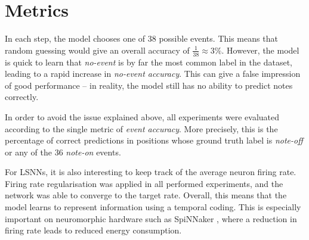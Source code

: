 \documentclass[../../report.tex]{subfiles}
\begin{document}
\section{Metrics}

In each step, the model chooses one of 38 possible events. This means that
random guessing would give an overall accuracy of \(\frac{1}{38} \approx 3\%\).
However, the model is quick to learn that \emph{no-event} is by far the most
common label in the dataset, leading to a rapid increase in \emph{no-event
accuracy}. This can give a false impression of good performance -- in reality,
the model still has no ability to predict notes correctly.


In order to avoid the issue explained above, all experiments were evaluated
according to the single metric of \emph{event accuracy}. More precisely, this is
the percentage of correct predictions in positions whose ground truth label is
\emph{note-off} or any of the 36 \emph{note-on} events.

For LSNNs, it is also interesting to keep track of the average neuron firing
rate. Firing rate regularisation was applied in all performed
experiments, and the network was able to converge to the target rate. Overall,
this means that the model learns to represent information using a temporal
coding. This is especially important on neuromorphic hardware such as SpiNNaker
\cite{Furber2014}, where a reduction in firing rate leads to reduced energy
consumption.

\end{document}
